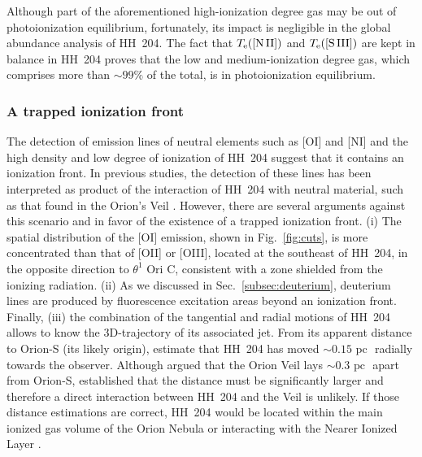 \documentclass[twocolumn,linenumbers]{aastex63}
\newcommand{\cesar}[1]{{\color{red}C: #1}}
\begin{document}
Although part of the aforementioned high-ionization degree gas may be out of photoionization equilibrium, fortunately, its impact is negligible in the global abundance analysis of HH~204. The fact that $T_{\rm e}(\text{[N\thinspace II]})$ and $T_{\rm e}(\text{[S\thinspace III]})$ are kept in balance in HH~204 proves that the low and medium-ionization degree gas, which comprises more than $\sim 99\%$ of the total, is in photoionization equilibrium.

\subsubsection{A trapped ionization front}
\label{subsubsec:trapped_IF}

The detection of emission lines of neutral elements such as [O\thinspace I] and [N\thinspace I] and the high density and low degree of ionization of HH~204 suggest that it contains an ionization front. In previous studies, the detection of these lines has been interpreted as product of the interaction of HH~204 with neutral material, such as that found in the Orion's Veil \citep[][]{ODell:1997a,odell97,takami02}. However, there are several arguments against this scenario and in favor of the existence of a trapped ionization front. (i) The spatial distribution of the [O\thinspace I] emission, shown in Fig.~\ref{fig:cuts}, is more concentrated than that of [O\thinspace II] or [O\thinspace III], located at the southeast of HH~204, in the opposite direction to $\theta^{1} \text{ Ori C}$, consistent with a zone shielded from the ionizing radiation. (ii) As we discussed in Sec.~\ref{subsec:deuterium}, deuterium lines are produced by fluorescence excitation areas beyond an ionization front. Finally, (iii) the combination of the tangential and radial motions of HH~204 allows to know the 3D-trajectory of its associated jet. From its apparent distance to Orion-S (its likely origin), \citet{Doi:2004a} estimate that HH~204 has moved $\sim 0.15 \text{ pc }$ radially towards the observer. Although \citet[][]{vanderWerf13} argued that the Orion Veil lays $\sim 0.3 \text{ pc }$ apart from Orion-S, \citet[][]{abel16} established that the distance must be significantly larger and therefore a direct interaction between HH~204 and the Veil is unlikely. If those distance estimations are correct, HH~204 would be located within the main ionized gas volume of the Orion Nebula or interacting with the Nearer Ionized Layer  \citep[NIL, see][]{Abel19,Odell20}. %
\end{document}
